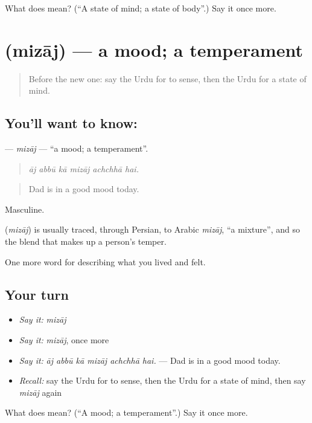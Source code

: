 \begin{tcolorbox}[breakable,colback=teal!4,colframe=teal!35!black,title={Before you move on}]
What does  mean? (\textquotedblleft{}A state of mind; a state of body\textquotedblright{}.) Say it once more.
\end{tcolorbox}
\section[\texorpdfstring{\ur{مزاج} (mizāj)}{مزاج (mizāj)}]{ (mizāj) — a mood; a temperament}

\label{lesson:UR-C440-mizaj}



\begin{quote}
Before the new one: say the Urdu for to sense, then the Urdu for a state of mind.
\end{quote}

\subsection*{You'll want to know: }
\textbf{} — \emph{mizāj} — \textquotedblleft{}a mood; a temperament\textquotedblright{}.

\begin{quote}
     
\end{quote}

\begin{quote}
\emph{āj abbū kā mizāj achchhā hai.}
\end{quote}

\begin{quote}
Dad is in a good mood today.
\end{quote}

Masculine.

\begin{cousinweb}
\textbf{} (\emph{mizāj}) is usually traced, through Persian, to Arabic \emph{mizāj}, \textquotedblleft{}a mixture\textquotedblright{}, and so the blend that makes up a person's temper.
\end{cousinweb}

\begin{grammarlens}[title={What you've built}]
One more word for describing what you lived and felt.
\end{grammarlens}

\subsection*{Your turn}
\begin{itemize}
\raggedright
  \item \emph{Say it:} \emph{mizāj}
  \item \emph{Say it:} \emph{mizāj}, once more
  \item \emph{Say it:} \emph{āj abbū kā mizāj achchhā hai.} — Dad is in a good mood today.
  \item \emph{Recall:} say the Urdu for to sense, then the Urdu for a state of mind, then say \emph{mizāj} again
\end{itemize}

\begin{tcolorbox}[breakable,colback=teal!4,colframe=teal!35!black,title={Before you move on}]
What does  mean? (\textquotedblleft{}A mood; a temperament\textquotedblright{}.) Say it once more.
\end{tcolorbox}

